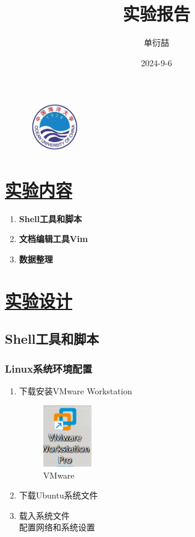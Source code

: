 \documentclass[a4paper,12pt]{article}
\begin{document}
\begin{figure}[t]
    \includegraphics[width=0.2\textwidth]{ouc.jpg}
\end{figure}

\title{实验报告}
\author{单衍喆 }
\date{2024-9-6}
\maketitle

\tableofcontents
\newpage


\section{\underline{\color{blue}实验内容}}

\begin{enumerate}
    \item \textbf{Shell工具和脚本}
    \item \textbf{文档编辑工具Vim}
    \item \textbf{数据整理}
\end{enumerate}

\section{\underline{\color{blue}实验设计}}
\subsection{\color{red}Shell工具和脚本}

\subsubsection{\color{green}Linux系统环境配置}
\begin{enumerate}
    \item 下载安装VMware Workstation
          \begin{figure}[htbp]
              \centering
              \includegraphics[width=0.2\textwidth]{VMware.png}
              \caption{VMware}
              \label{VMware}
          \end{figure}
    \item 下载Ubuntu系统文件
    \item 载入系统文件\\
配置网络和系统设置

\end{enumerate}
\end{document}
